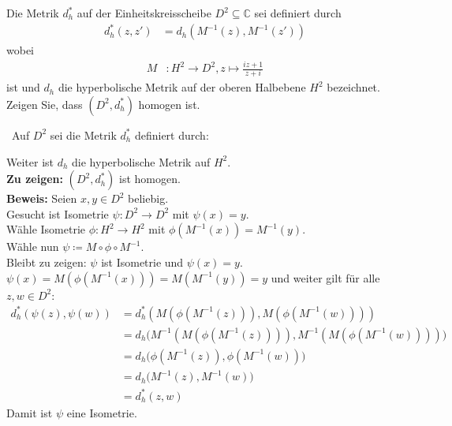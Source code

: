 \begin{assignment}
 Die Metrik $d_h^\ast$ auf der Einheitskreisscheibe $D^2 \subseteq \mathbb{C}$ sei definiert durch 
   \begin{align*}
    d_h^\ast (z, z') &= d_h(M^{-1}(z),M^{-1}(z')) 
  \end{align*}
  wobei
  \begin{align*} 
    M &: H^2 \to D^2, z \mapsto \frac{iz + 1}{z + i}
  \end{align*}
  ist und $d_h$ die hyperbolische Metrik auf der oberen Halbebene $H^2$ bezeichnet.\\
  Zeigen Sie, dass $(D^2, d_h^\ast)$ homogen ist.
\end{assignment}
\begin{solution}
 \
  Auf \( D^2 \) sei die Metrik \( d_h^\ast \) definiert durch:

  Weiter ist \( d_h \) die hyperbolische Metrik auf \( H^2 \). \\
  \textbf{Zu zeigen:} \( (D^2, d_h^\ast) \) ist homogen. \\
  \textbf{Beweis:} Seien \( x,y \in D^2 \) beliebig. \\
  Gesucht ist Isometrie \( \psi: D^2 \to D^2 \) mit \( \psi(x) = y \). \\
  Wähle Isometrie \( \phi: H^2 \to H^2 \) mit \( \phi(M^{-1}(x)) = M^{-1}(y) \). \\
  Wähle nun \( \psi \coloneqq M \circ \phi \circ M^{-1} \). \\
  Bleibt zu zeigen: \( \psi \) ist Isometrie und \( \psi(x) = y \). \\
  \( \psi(x) = M(\phi(M^{-1}(x))) = M(M^{-1}(y)) = y \) und weiter gilt für alle \( z, w \in D^2 \):
  \begin{align*}
    d_h^\ast(\psi(z), \psi(w)) &= d_h^\ast (M(\phi(M^{-1}(z))), M(\phi(M^{-1}(w)))) \\
    &= d_h \big(M^{-1}(M(\phi(M^{-1}(z)))), M^{-1}(M(\phi(M^{-1}(w))))\big) \\
    &= d_h \big(\phi(M^{-1}(z)), \phi(M^{-1}(w))\big) \\
    &= d_h \big(M^{-1}(z), M^{-1}(w)) \\
    &= d_h^\ast (z, w)
  \end{align*}
  Damit ist \( \psi \) eine Isometrie.

\end{solution}























